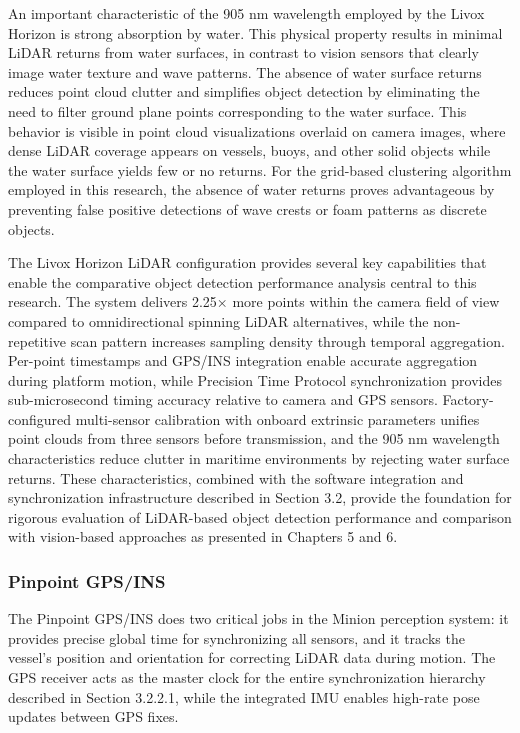 \documentclass{erauthesis}
\begin{document}
An important characteristic of the 905 nm wavelength employed by the Livox Horizon is strong absorption by water.
This physical property results in minimal \ac{LiDAR} returns from water surfaces, in contrast to vision sensors that clearly image water texture and wave patterns.
The absence of water surface returns reduces point cloud clutter and simplifies object detection by eliminating the need to filter ground plane points corresponding to the water surface.
This behavior is visible in point cloud visualizations overlaid on camera images, where dense \ac{LiDAR} coverage appears on vessels, buoys, and other solid objects while the water surface yields few or no returns.
For the grid-based clustering algorithm employed in this research, the absence of water returns proves advantageous by preventing false positive detections of wave crests or foam patterns as discrete objects.

The Livox Horizon \ac{LiDAR} configuration provides several key capabilities that enable the comparative object detection performance analysis central to this research.
The system delivers 2.25× more points within the camera field of view compared to omnidirectional spinning \ac{LiDAR} alternatives, while the non-repetitive scan pattern increases sampling density through temporal aggregation.
Per-point timestamps and \ac{GPS}/\ac{INS} integration enable accurate aggregation during platform motion, while Precision Time Protocol synchronization provides sub-microsecond timing accuracy relative to camera and \ac{GPS} sensors.
Factory-configured multi-sensor calibration with onboard extrinsic parameters unifies point clouds from three sensors before transmission, and the 905 nm wavelength characteristics reduce clutter in maritime environments by rejecting water surface returns.
These characteristics, combined with the software integration and synchronization infrastructure described in Section 3.2, provide the foundation for rigorous evaluation of \ac{LiDAR}-based object detection performance and comparison with vision-based approaches as presented in Chapters 5 and 6.

            \subsubsection{Pinpoint GPS/INS}

The Pinpoint \ac{GPS}/\ac{INS} does two critical jobs in the Minion perception system: it provides precise global time for synchronizing all sensors, and it tracks the vessel's position and orientation for correcting \ac{LiDAR} data during motion.
The \ac{GPS} receiver acts as the master clock for the entire synchronization hierarchy described in Section 3.2.2.1, while the integrated \ac{IMU} enables high-rate pose updates between \ac{GPS} fixes.
\end{document}
